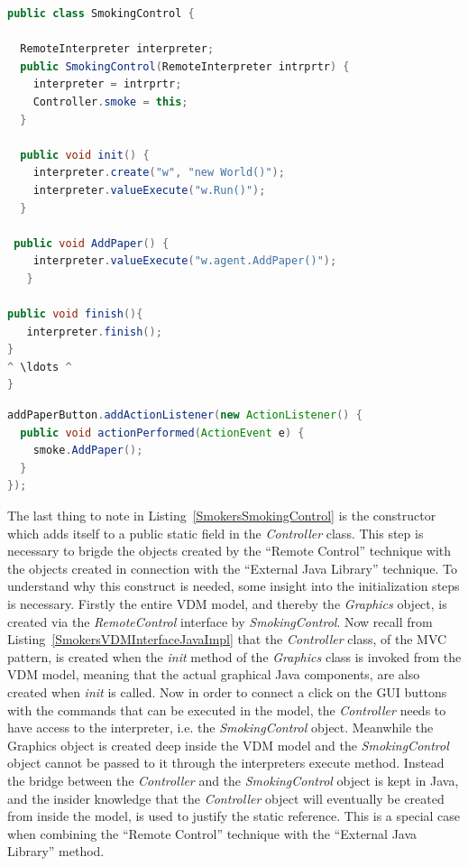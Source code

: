 \documentclass{overturerepchap}
\begin{document}
\begin{lstlisting}[language=Java,label=SmokersSmokingControl,caption=Java implementation of the bridge between the GUI and the interpreter executing the VDM model, captionpos=b]
public class SmokingControl {

  RemoteInterpreter interpreter;
  public SmokingControl(RemoteInterpreter intrprtr) {
    interpreter = intrprtr;
    Controller.smoke = this;
  }
  	
  public void init() {
    interpreter.create("w", "new World()");	
    interpreter.valueExecute("w.Run()");
  }

 public void AddPaper() {
    interpreter.valueExecute("w.agent.AddPaper()");
   }

public void finish(){
   interpreter.finish();
}
^ \ldots ^
}
\end{lstlisting}

\begin{lstlisting}[language=Java,label=SmokersButtonClickAction,caption=Java implementation of the Button click action invoking the remote intepreter, captionpos=b]
addPaperButton.addActionListener(new ActionListener() {
  public void actionPerformed(ActionEvent e) {	
    smoke.AddPaper();
  }
});	
\end{lstlisting}

The last thing to note in Listing~\ref{SmokersSmokingControl} is the constructor which adds itself to a public static field in the \textit{Controller} class. This step is necessary to brigde the objects created by the ``Remote Control'' technique with the objects created in connection with the ``External Java Library'' technique.
To understand why this construct is needed, some insight into the initialization steps is necessary. Firstly the entire VDM model, and thereby the \textit{Graphics} object, is created via the \textit{RemoteControl} interface by \textit{SmokingControl}. Now recall from Listing~\ref{SmokersVDMInterfaceJavaImpl} that the \textit{Controller} class, of the MVC pattern, is created when the \textit{init} method of the \textit{Graphics} class is invoked from the VDM model, meaning that the actual graphical Java components, are also created when \textit{init} is called. Now in order to connect a click on the GUI buttons with the commands that can be executed in the model, the \textit{Controller} needs to have access to the interpreter, i.e. the \textit{SmokingControl} object. Meanwhile the Graphics object is created deep inside the VDM model and the \textit{SmokingControl} object cannot be passed to it through the interpreters execute method. Instead the bridge between the \textit{Controller} and the \textit{SmokingControl} object is kept in Java, and the insider knowledge that the \textit{Controller} object will eventually be created from inside the model, is used  to justify the static reference. This is a special case when combining the ``Remote Control'' technique with the ``External Java Library'' method.
\end{document}
